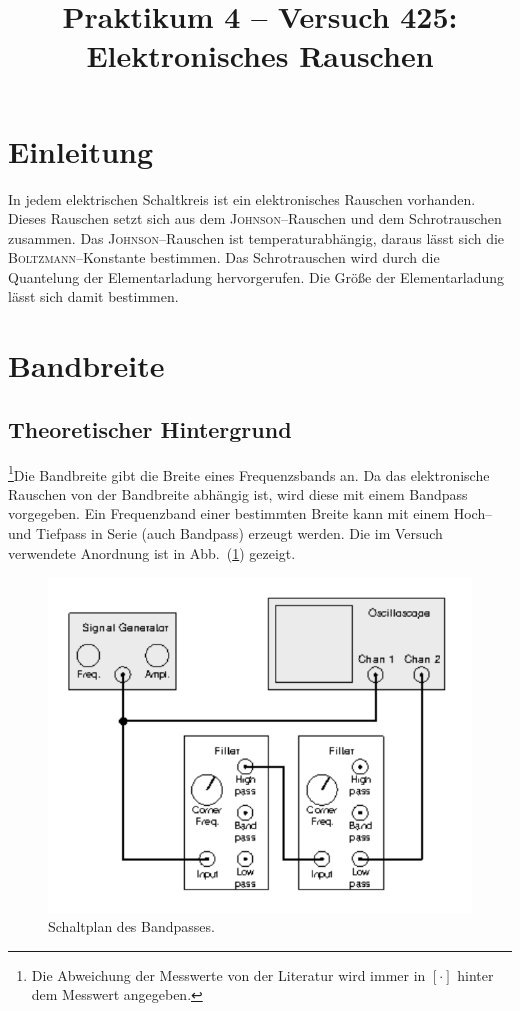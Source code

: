 \documentclass[sn-mathphys-num,iicol]{sn-jnl}
\theoremstyle{thmstyleone}
\theoremstyle{thmstyletwo}
\theoremstyle{thmstylethree}
\begin{document}
        
\title[]{Praktikum 4 -- Versuch 425: Elektronisches Rauschen}
\author*[1]{ }
\author*[1]{ }

\maketitle

\section{Einleitung}
In jedem elektrischen Schaltkreis ist ein elektronisches Rauschen vorhanden.
Dieses Rauschen setzt sich aus dem \textsc{Johnson}--Rauschen und dem Schrotrauschen zusammen.
Das \textsc{Johnson}--Rauschen ist temperaturabhängig, daraus lässt sich die \textsc{Boltzmann}--Konstante bestimmen.
Das Schrotrauschen wird durch die Quantelung der Elementarladung hervorgerufen. 
Die Größe der Elementarladung lässt sich damit bestimmen.

\section{Bandbreite}
\subsection{Theoretischer Hintergrund}
\footnote{Die Abweichung der Messwerte von der Literatur wird immer in $[\cdot ]$ hinter dem Messwert angegeben.}Die Bandbreite gibt die Breite eines Frequenzsbands an.
Da das elektronische Rauschen von der Bandbreite abhängig ist, wird diese mit einem Bandpass vorgegeben.
Ein Frequenzband einer bestimmten Breite kann mit einem Hoch-- und Tiefpass in Serie (auch Bandpass) erzeugt werden.
Die im Versuch verwendete Anordnung ist in Abb.\ (\ref{fig:schaltplan_bandpass}) gezeigt.

\begin{figure}[t]
        \centering
        \includegraphics[width=.5\textwidth]{425_schaltplan_bandpass.png}
        \caption{Schaltplan des Bandpasses.\cite{anleitung425}} \label{fig:schaltplan_bandpass}
\end{figure}
\end{document}
